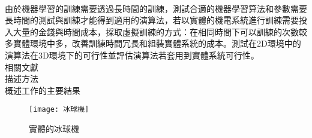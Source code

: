 \begin{flushleft}
\fontsize{12pt}{12pt} \\
\end{flushleft}

由於機器學習的訓練需要透過長時間的訓練，測試合適的機器學習算法和參數需要長時間的測試與訓練才能得到適用的演算法，若以實體的機電系統進行訓練需要投入大量的金錢與時間成本，採取虛擬訓練的方式：在相同時間下可以訓練的次數較多實體環境中多，改善訓練時間冗長和組裝實體系統的成本。測試在2D環境中的演算法在3D環境下的可行性並評估演算法若套用到實體系統可行性。\\

相關文獻\\

描述方法\\

概述工作的主要結果\\


\begin{figure}[hbt!]
\begin{center}
\texttt{[image: 冰球機]}	
\caption{實體的冰球機}\label{fig.冰球機}	
\end{center}
\end{figure}
\newpage